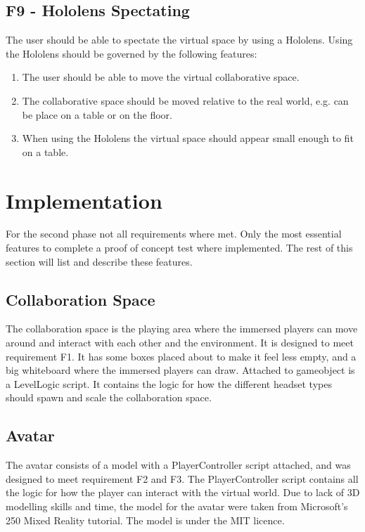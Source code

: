         \subsection{F9 - Hololens Spectating}
        The user should be able to spectate the virtual space by using a Hololens. Using the Hololens should be governed by the following features:
        \begin{enumerate}
            \item The user should be able to move the virtual collaborative space.
            \item The collaborative space should be moved relative to the real world, e.g. can be place on a table or on the floor.
            \item When using the Hololens the virtual space should appear small enough to fit on a table.
        \end{enumerate}
    
    \section{Implementation} %
    For the second phase not all requirements where met. Only the most essential features to complete a proof of concept test where implemented. The rest of this section will list and describe these features.
    
        \subsection{Collaboration Space}
        The collaboration space is the playing area where the immersed players can move around and interact with each other and the environment. It is designed to meet requirement F1. It has some boxes placed about to make it feel less empty, and a big whiteboard where the immersed players can draw. Attached to gameobject is a LevelLogic script. It contains the logic for how the different headset types should spawn and scale the collaboration space. %
        
        \subsection{Avatar}
        The avatar consists of a model with a PlayerController script attached, and was designed to meet requirement F2 and F3. The PlayerController script contains all the logic for how the player can interact with the virtual world. Due to lack of 3D modelling skills and time, the model for the avatar were taken from Microsoft's 250 Mixed Reality tutorial. The model is under the MIT licence. %
    
